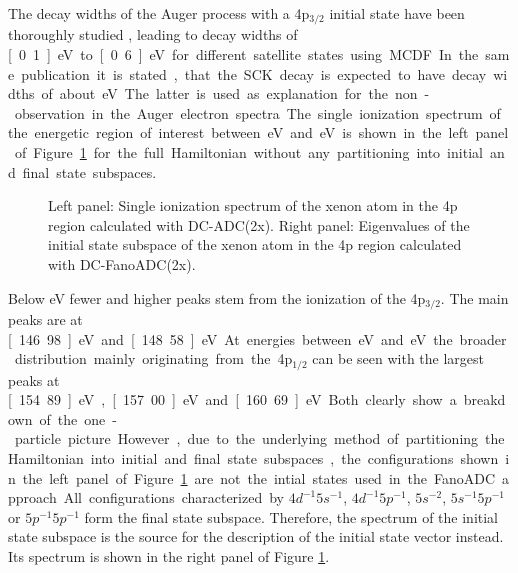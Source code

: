 The decay widths of the Auger process with a 4p$_{3/2}$ initial state have
been thoroughly studied \cite{Heinaesmaeki04}, leading
to decay widths of \unit[0.1]{eV} to
\unit[0.6]{eV} for different satellite states using \ac{MCDF}. In the same publication
it is stated, that the \ac{SCK} decay is expected to have decay widths of
about \unit[10--100]{eV}. The latter is used as explanation for the non-observation
in the Auger electron spectra.


The single ionization spectrum of the energetic region of
interest between \unit[140]{eV} and \unit[170]{eV} is shown in the left panel of
Figure
\ref{figure:Xe4p_SIPs} for the full Hamiltonian without any partitioning
into initial and final state subspaces.

\begin{figure}[]
  \centering
  
  
  \caption{Left panel: Single ionization spectrum of the xenon atom in the 4p region
           calculated with DC-ADC(2x).
           Right panel: Eigenvalues of the initial state subspace of the
           xenon atom in the 4p region                                      
           calculated with DC-FanoADC(2x).}
  \label{figure:Xe4p_SIPs}
\end{figure}

Below \unit[150]{eV} fewer and higher peaks stem from the ionization of the
4p$_{3/2}$. The main peaks are at \unit[146.98]{eV} and \unit[148.58]{eV}.
At energies between \unit[150]{eV} and \unit[165]{eV} the broader
distribution mainly originating from the 4p$_{1/2}$ can be seen with the largest
peaks at \unit[154.89]{eV}, \unit[157.00]{eV} and \unit[160.69]{eV}. Both clearly
show a breakdown of the one-particle picture.

However, due to the underlying method of partitioning the Hamiltonian into
initial and final state subspaces, the configurations shown in the left panel of Figure
\ref{figure:Xe4p_SIPs} are not the intial states used in the FanoADC approach.
All configurations characterized by $4d^{-1}5s^{-1}$, $4d^{-1}5p^{-1}$,
$5s^{-2}$, $5s^{-1}5p^{-1}$ or $5p^{-1}5p^{-1}$ form the final state subspace.
Therefore, the spectrum of the initial state subspace is the source for
the description of the initial state vector instead. Its spectrum is shown in
the right panel of Figure \ref{figure:Xe4p_SIPs}.

